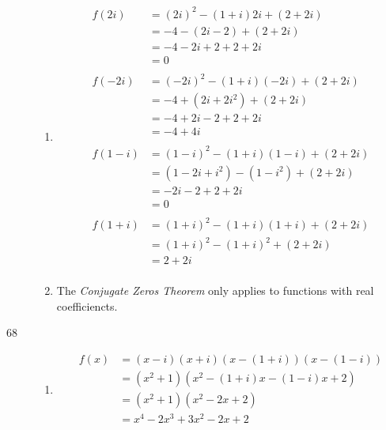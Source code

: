 \documentclass{exam}
\begin{document}
\begin{description}
        \begin{enumerate}[a]
          \item 
            \begin{align*}
              f(2i) &= (2i)^2 - (1 + i)2i + (2 + 2i) \\
                    &= -4 - (2i - 2) + (2 + 2i) \\
                    &= -4 - 2i + 2 + 2 + 2i \\
                    &= 0 \\
              \\
              f(-2i) &= (-2i)^2 - (1 + i)(-2i) + (2 + 2i) \\
                     &= -4 + (2i + 2i^2) + (2 + 2i) \\
                     &= -4 + 2i - 2 + 2 + 2i \\
                     &= -4 + 4i \\
              \\
              f(1 - i) &= (1 - i)^2 - (1 + i)(1 - i) + (2 + 2i) \\
                       &= (1 - 2i + i^2) - (1 - i^2) + (2 + 2i) \\
                       &= - 2i - 2 + 2 + 2i \\
                       &= 0 \\
                       \\
              f(1 + i) &= (1 + i)^2 - (1 + i)(1 + i) + (2 + 2i) \\
                       &= (1 + i)^2 - (1 + i)^2 + (2 + 2i) \\
                       &= 2 + 2i \\
            \end{align*}

          \item The {\em Conjugate Zeros Theorem} only applies to functions with real coefficiencts.

        \end{enumerate}

    \pagebreak

      \item[68]
        \begin{enumerate}[a]
          \item 
            \begin{align*}
              f(x) &= (x - i)(x + i)(x - (1 + i))(x - (1 - i)) \\
                   &= (x^2 + 1)(x^2 - (1 +i)x - (1 - i)x + 2) \\
                   &= (x^2 + 1)(x^2 - 2x + 2) \\
                   &= \boxed{x^4 - 2x^3 + 3x^2 - 2x + 2} \\
            \end{align*}


\end{enumerate}
\end{description}
\end{document}
